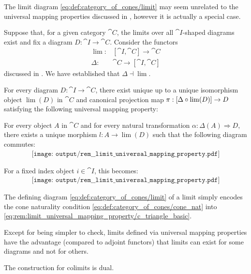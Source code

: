 \begin{remark}\label{rem:limit_universal_mapping_property}
  The limit diagram \eqref{eq:def:category_of_cones/limit} may seem unrelated to the universal mapping properties discussed in , however it is actually a special case.

  Suppose that, for a given category \( \cat{C} \), the limits over all \( \cat{I} \)-shaped diagrams exist and fix a diagram \( D: \cat{I} \to \cat{C} \). Consider the functors
  \begin{align*}
    \lim:   &[\cat{I}, \cat{C}] \to \cat{C} \\
    \Delta: &\cat{C} \to [\cat{I}, \cat{C}]
  \end{align*}
  discussed in . We have established that \( \Delta \dashv \lim \).

  For every diagram \( D: \cat{I} \to \cat{C} \), there exist unique up to a unique isomorphism object \( \lim(D) \) in \( \cat{C} \) and canonical projection map \( \pi: [\Delta \bincirc {\lim}(D)] \to D \) satisfying the following universal mapping property:
  \begin{displayquote}
    For every object \( A \) in \( \cat{C} \) and for every natural transformation \( \alpha: \Delta(A) \Rightarrow D \), there exists a unique morphism \( l: A \to \lim(D) \) such that the following diagram commutes:
    \begin{equation}\label{eq:rem:limit_universal_mapping_property/ic_triangle}
      \begin{aligned}
        \texttt{[image: output/rem\_\_limit\_universal\_mapping\_property.pdf]}
      \end{aligned}
    \end{equation}
  \end{displayquote}

  For a fixed index object \( i \in \cat{I} \), this becomes:
  \begin{equation}\label{eq:rem:limit_universal_mapping_property/c_triangle_basic}
    \begin{aligned}
      \texttt{[image: output/rem\_\_limit\_universal\_mapping\_property.pdf]}
    \end{aligned}
  \end{equation}

  The defining diagram \eqref{eq:def:category_of_cones/limit} of a limit simply encodes the cone naturality condition \eqref{eq:def:category_of_cones/cone_nat} into \eqref{eq:rem:limit_universal_mapping_property/c_triangle_basic}.

  Except for being simpler to check, limits defined via universal mapping properties have the advantage (compared to adjoint functors) that limits can exist for some diagrams and not for others.

  The construction for colimits is dual.
\end{remark}

